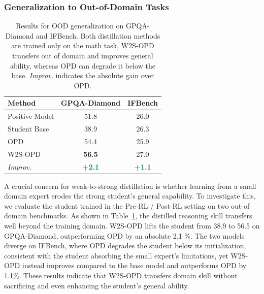 \documentclass{article}
\newcommand{\imp}[1]{\textcolor{teal}{\textbf{+#1}}}
\newcommand\ours{W2S-OPD\xspace}
\begin{document}
\subsubsection{Generalization to Out-of-Domain Tasks}
\label{sec:ood}
\begin{table}
\centering

\vspace{-20pt}
\caption{Results for OOD generalization on GPQA-Diamond and IFBench. Both distillation methods are trained only on the math task, \ours transfers out of domain and improves general ability, whereas OPD can degrade it below the base. \textit{Improv.} indicates the absolute gain over OPD.}
\vspace{5pt}
\begin{tabular}{l c c}
\toprule
\textbf{Method} & \textbf{GPQA-Diamond} & \textbf{IFBench}\\
\midrule
Positive Model  & 51.8 & 26.0\\
Student Base  & 38.9 & 26.3\\
\midrule
OPD                        & 54.4 & 25.9\\
\rowcolor{oursbg}
\ours                      & \textbf{56.5} & 27.0 \\
\rowcolor{oursbg}
\textit{Improv.}           & \imp{2.1} & \imp{1.1}\\
\bottomrule
\end{tabular}
\label{tab:gpqa}
\end{table}
A crucial concern for weak-to-strong distillation is whether learning from a small domain expert erodes the strong student's general capability. To investigate this, we evaluate the student trained in the Pre-RL / Post-RL setting on two out-of-domain benchmarks. As shown in Table~\ref{tab:gpqa}, the distilled reasoning skill transfers well beyond the training domain. \ours lifts the student from 38.9 to 56.5 on GPQA-Diamond, outperforming OPD by an absolute 2.1 \%. The two models diverge on IFBench, where OPD degrades the student below its initialization, consistent with the student absorbing the small expert's limitations, yet \ours instead improves compared to the base model and outperforms OPD by 1.1\%. These results indicate that \ours transfers domain skill without sacrificing and even enhancing the student's general ability.
\end{document}
